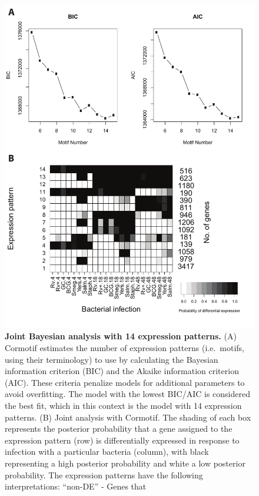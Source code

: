\begin{figure}[htbp]
\centering
\includegraphics[width=5in]{img/ch02/fig-S03-joint-all-k14.pdf}
\caption[Joint Bayesian analysis with 14 expression
  patterns.]{\textbf{Joint Bayesian analysis with 14 expression
    patterns.} (A) Cormotif \citep{Wei2015} estimates the number of
  expression patterns (i.e.~motifs, using their terminology) to use by
  calculating the Bayesian information criterion (BIC) and the Akaike
  information criterion (AIC). These criteria penalize models for
  additional parameters to avoid overfitting. The model with the
  lowest BIC/AIC is considered the best fit, which in this context is
  the model with 14 expression patterns. (B) Joint analysis with
  Cormotif. The shading of each box represents the posterior
  probability that a gene assigned to the expression pattern (row) is
  differentially expressed in response to infection with a particular
  bacteria (column), with black representing a high posterior
  probability and white a low posterior probability. The expression
  patterns have the following interpretations: ``non-DE'' - Genes that
}
\end{figure}
